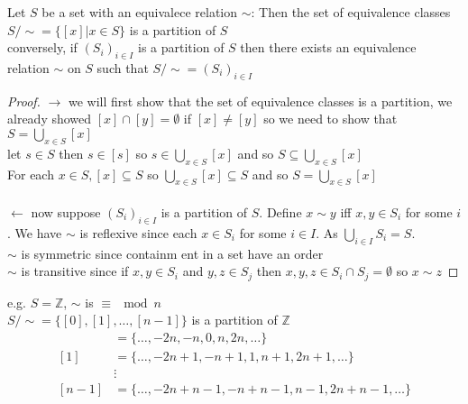 \documentclass{article}
\begin{document}
    \begin{theorem}
        Let $S$ be a set with an equivalece relation $\sim$: Then the set of equivalence classes $S / \sim = \{[x] | x \in S\}$ is a partition of $S$
        \\ 
        conversely, if $(S_i)_{i \in I}$ is a partition of $S$ then there exists an equivalence relation $\sim$ on $S$ such that $S / \sim = (S_i)_{i \in I}$
    \end{theorem}
    \begin{proof}
        $\rightarrow$ we will first show that the set of equivalence classes is a partition, we already showed $[x] \cap [y] = \emptyset$ if $[x] \not = [y]$ so we need to show that $S = \bigcup_{x \in S} [x]$ \\
        let $s \in S$ then $s \in [s]$ so $s \in \bigcup_{x \in S} [x]$ and so $S \subseteq \bigcup_{x \in S} [x]$ \\ 
        For each $x \in S, [x] \subseteq S$ so $\bigcup_{x \in S} [x] \subseteq S$ and so $S = \bigcup_{x \in S} [x]$ \\
        \\ $\leftarrow$ now suppose $(S_i)_{i \in I}$ is a partition of $S$. Define $x \sim y$ iff $x,y \in S_i$ for some $i$. We have $\sim$ is reflexive since each $x \in S_i$ for some $i \in I$. As $\bigcup_{i \in I} S_i = S$. 
        \\ $\sim$ is symmetric since containm ent in a set have an order 
        \\ $\sim$ is transitive since if $x,y \in S_i$ and $y,z \in S_j$ then $x,y,z \in S_i \cap S_j = \emptyset$ so $x \sim z$
    \end{proof}
    e.g. $S = \mathbb{Z}$, $\sim$ is $\equiv \mod n$
    \\ $S / \sim = \{[0], [1], \dots, [n-1]\}$ is a partition of $\mathbb{Z}$
    \begin{align}
        [0] &= \{\dots, -2n, -n, 0, n, 2n, \dots\} \\ 
        [1] &= \{\dots, -2n+1, -n+1, 1, n+1, 2n+1, \dots\} \\ 
        &\vdots \\ 
        [n-1] &= \{\dots, -2n + n-1, -n + n-1, n-1, 2n + n-1, \dots\}
    \end{align}
\end{document}
